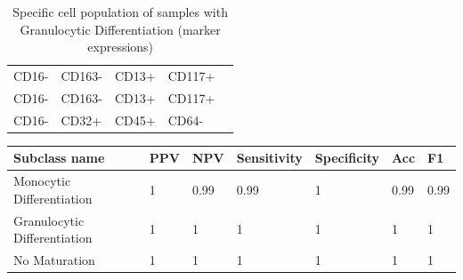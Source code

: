 \documentclass[landscape]{sciposter}
\begin{document}
\begin{multicols}{5}
\begin{itemize}
\begin{table}[htb]
\centering
\caption {Specific cell population of samples with Granulocytic Differentiation (marker expressions)}
\resizebox{0.5\textwidth}{!} {
\begin{tabular} {l l l l l}
CD16-	&CD163-	&CD13+	&CD117+\\
CD16-	&CD163-	&CD13+	&CD117+\\
CD16-	&CD32+	&CD45+	&CD64-\\

\end{tabular}}
\end{table}

\begin{table}[!htb]
  \centering
      {
\resizebox{\textwidth}{!} {
\begin{tabular} {l | l l l l l l}
Subclass name &PPV &NPV &Sensitivity &Specificity &Acc &F1\\
\hline\hline
Monocytic Differentiation	&1	&0.99	&0.99	&1	&0.99	&0.99\\
Granulocytic Differentiation	&1	&1	&1	&1	&1	&1\\
No Maturation	&1	&1	&1	&1	&1	&1\\
\end{tabular}}}
\end{table}


\end{itemize}
\end{multicols}
\end{document}

